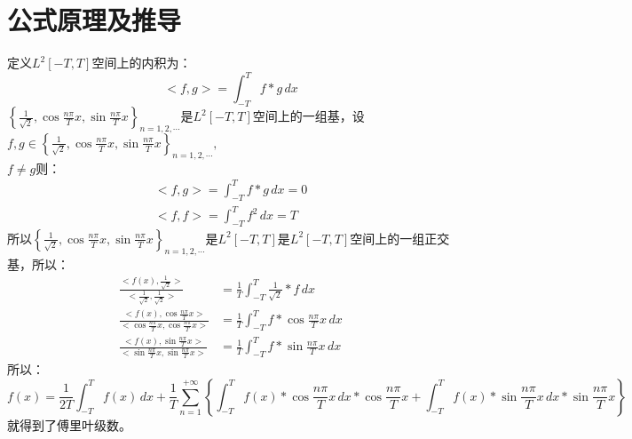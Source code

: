 \documentclass[12pt,a4paper]{article}
\begin{document}
\section{公式原理及推导}
定义$L^2[-T,T]$空间上的内积为：
$$
<f,g>=\int_{-T}^{T}f*g\,dx
$$
$\left\{\frac{1}{\sqrt{2}},\cos{\frac{n\pi}{T}x},\sin{\frac{n\pi}{T}x}\right\}_{n=1,2,\cdots}$是$L^2[-T,T]$空间上的一组基，设$f,g\in\left\{\frac{1}{\sqrt{2}},\cos{\frac{n\pi}{T}x},\sin{\frac{n\pi}{T}x}\right\}_{n=1,2,\cdots},$\\
$f\neq g$则：
\begin{align*}
<f,g>=\int_{-T}^{T}f*g\,dx=0\\
<f,f>=\int_{-T}^{T}f^2\,dx=T
\end{align*}
所以$\left\{\frac{1}{\sqrt{2}},\cos{\frac{n\pi}{T}x},\sin{\frac{n\pi}{T}x}\right\}_{n=1,2,\cdots}$是$L^2[-T,T]$是$L^2[-T,T]$空间上的一组正交基，所以：
\begin{align*}
\frac{<f(x),\frac{1}{\sqrt{2}}>}{<\frac{1}{\sqrt{2}},\frac{1}{\sqrt{2}}>}&=\frac{1}{T} \int_{-T}^{T}\frac{1}{\sqrt{2}}*f\,dx \\
\frac{<f(x),\cos{\frac{n\pi}{T}x}>}{<\cos{\frac{n\pi}{T}x},\cos{\frac{n\pi}{T}x}>}&=\frac{1}{T}\int_{-T}^{T}{f*\cos{\frac{n\pi}{T}x}}\,dx\\
\frac{<f(x),\sin{\frac{n\pi}{T}x}>}{<\sin{\frac{n\pi}{T}x},\sin{\frac{n\pi}{T}x}>}&=\frac{1}{T}\int_{-T}^{T}{f*\sin{\frac{n\pi}{T}x}}\,dx
\end{align*}
所以：
$$
f(x)=\frac{1}{2T}\int_{-T}^{T}{f(x)}\,dx+\frac{1}{T}\sum_{n=1}^{+\infty}\left\{{\int_{-T}^{T}{f(x)*\cos{\frac{n\pi}{T}x}}\,dx*\cos{\frac{n\pi}{T}x}+\int_{-T}^{T}{f(x)*\sin{\frac{n\pi}{T}x}}\,dx*\sin{\frac{n\pi}{T}x}}\right\}
$$
就得到了傅里叶级数。









































\cite{tam19912d}

\end{document}
